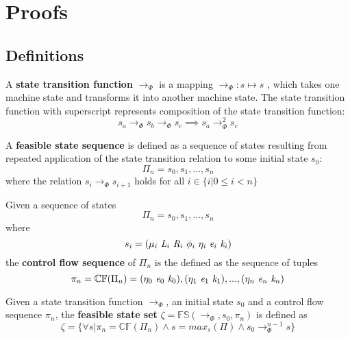 \section{Proofs}

\subsection{Definitions}

\begin{definition}
A \textbf{state transition function} $\rightarrow_{\Phi}$ is a mapping $\rightarrow_{\Phi} : s \mapsto s$ , which takes one machine state and transforms it into another machine state. The state transition function with superscript represents composition of the state transition function: $$ s_a \rightarrow_{\Phi} s_b \rightarrow_{\Phi} s_c \implies s_a \rightarrow_{\Phi}^2 s_c $$
\end{definition}

\begin{definition}
A \textbf{feasible state sequence} is defined as a sequence of states resulting from repeated application of the state transition relation to some initial state $s_0$: $$\Pi_n = s_0,s_1,...,s_n$$ where the relation $s_i \rightarrow_{\Phi} s_{i+1}$ holds for all $i \in \{ i | 0 \leq i < n \}$
\end{definition}

\begin{definition}
Given a sequence of states $$\Pi_n = s_0,s_1,...,s_n$$ where $$s_i = ( \mu_i\ \cfgnt{L}_i\ \cfgnt{R}_i\ \phi_i\ \eta_i\ \cfgnt{e}_i\ \cfgnt{k}_i )$$ the \textbf{control flow sequence} of $\Pi_n$ is the defined as the sequence of tuples $$ \pi_n = \mathbb{CF}(\Pi_n) = (\eta_0\ \cfgnt{e}_0\ \cfgnt{k}_0),(\eta_1\ \cfgnt{e}_1\ \cfgnt{k}_1),...,(\eta_n\ \cfgnt{e}_n\ \cfgnt{k}_n)$$
\end{definition}

\begin{definition}
Given a state transition function $\rightarrow_{\Phi}$, an initial state $s_0$ and a control flow sequence $\pi_n$, the \textbf{feasible state set} $\zeta = \mathbb{FS}(\rightarrow_{\Phi},s_0,\pi_n)$ is defined as
 $$\zeta = \{ \forall s | \pi_n = \mathbb{CF}(\Pi_n) \wedge s = max_s(\Pi) \wedge s_0 \rightarrow_{\Phi}^{n-1} s\} $$
\end{definition}

